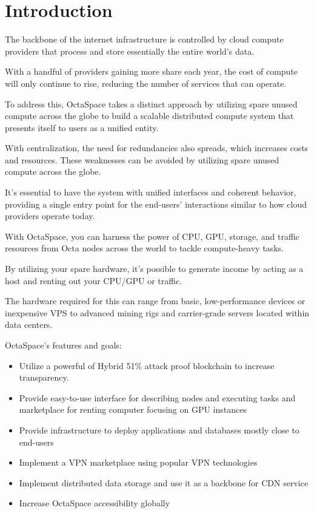 \section{Introduction}
The backbone of the internet infrastructure is controlled by cloud compute providers that process and store essentially the entire world's data.

With a handful of providers gaining more share each year, the cost of compute will only continue to rise, reducing the number of services that can operate.

To address this, OctaSpace takes a distinct approach by utilizing spare unused compute across the globe to build a scalable distributed compute system that presents itself to users as a unified entity.

With centralization, the need for redundancies also spreads, which increases costs and resources.
These weaknesses can be avoided by utilizing spare unused compute across the globe.

It's essential to have the system with unified interfaces and coherent behavior, providing a single entry point for the end-users' interactions similar to how cloud providers operate today.

With OctaSpace, you can harness the power of CPU, GPU, storage, and traffic resources from Octa nodes across the world to tackle compute-heavy tasks.

By utilizing your spare hardware, it's possible to generate income by acting as a host and renting out your CPU/GPU or traffic.

The hardware required for this can range from basic, low-performance devices or inexpensive VPS to advanced mining rigs and carrier-grade servers located within data centers.

OctaSpace's features and goals:

\begin{itemize}
    \item Utilize a powerful of Hybrid 51\% attack proof blockchain to increase transparency.
    \item Provide easy-to-use interface for describing nodes and executing tasks and marketplace for renting computer focusing on GPU instances
    \item Provide infrastructure to deploy applications and databases mostly close to end-users
    \item Implement a VPN marketplace using popular VPN technologies
    \item Implement distributed data storage and use it as a backbone for CDN service
    \item Increase OctaSpace accessibility globally
\end{itemize}

